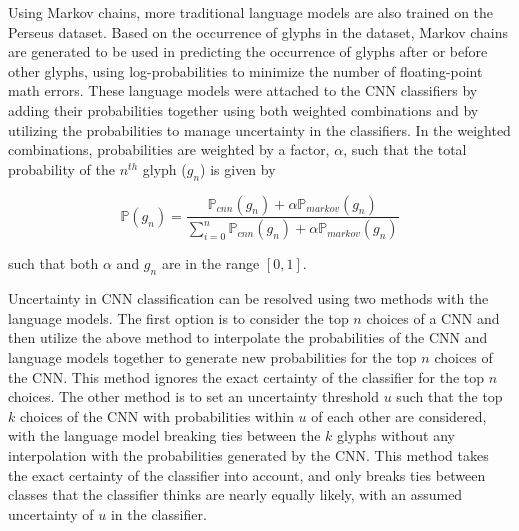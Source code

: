 Using Markov chains, more traditional language models are also trained on the Perseus dataset. Based on the occurrence of glyphs in the dataset, Markov chains are generated to be used in predicting the occurrence of glyphs after or before other glyphs, using log-probabilities to minimize the number of floating-point math errors. These language models were attached to the CNN classifiers by adding their probabilities together using both weighted combinations and by utilizing the probabilities to manage uncertainty in the classifiers. In the weighted combinations, probabilities are weighted by a factor, $\alpha$, such that the total probability of the $n^{th}$ glyph ($g_n$) is given by

\begin{equation}
\mathbb{P}(g_n)=\frac{\mathbb{P}_{cnn}(g_n)+\alpha\mathbb{P}_{markov}(g_n)}{\sum_{i=0}^{n}{\mathbb{P}_{cnn}(g_n)+\alpha\mathbb{P}_{markov}(g_n)}}
\end{equation}

such that both $\alpha$ and $g_n$ are in the range $[0,1]$.

Uncertainty in CNN classification can be resolved using two methods with the language models. The first option is to consider the top $n$ choices of a CNN and then utilize the above method to interpolate the probabilities of the CNN and language models together to generate new probabilities for the top $n$ choices of the CNN. This method ignores the exact certainty of the classifier for the top $n$ choices. The other method is to set an uncertainty threshold $u$ such that the top $k$ choices of the CNN with probabilities within $u$ of each other are considered, with the language model breaking ties between the $k$ glyphs without any interpolation with the probabilities generated by the CNN. This method takes the exact certainty of the classifier into account, and only breaks ties between classes that the classifier thinks are nearly equally likely, with an assumed uncertainty of $u$ in the classifier.

%
